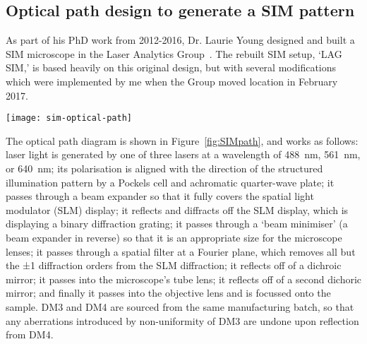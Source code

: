 \subsection{Optical path design to generate a SIM pattern} \label{sec:lagsim-path}
As part of his PhD work from 2012-2016, Dr. Laurie Young designed and built a SIM microscope in the Laser Analytics Group~\cite{young2016guide}. 
The rebuilt SIM setup, `LAG SIM,' is based heavily on this original design, but with several modifications which were implemented by me when the Group moved location in February 2017. 

\begin{sidewaysfigure}[p]
\centering
\texttt{[image: sim-optical-path]}
\caption[LAG SIM: Optics pattern laser light with a SIM pattern and apply polarisation rotation for optical sectioning and resolution enhancement]{The optical layout of the SIM aligns light from one of 3 lasers onto an optical path. The light passes through a Pockels cell and quarter wave plate for polarisation rotation, before a square-wave pattern is applied by a spatial light modulator. The patterned light is passed through a spatial mask in the Fourier plane to produce a sinusoidal pattern, which is relayed onto the sample. The objective lens collects fluorescent emission light,  which is filtered to remove any reflected excitation light before reaching the sCMOS camera.}
\label{fig:SIMpath}
\end{sidewaysfigure}

The optical path diagram is shown in Figure~\ref{fig:SIMpath}, and works as follows: laser light is generated by one of three lasers at a wavelength of \SI{488}{\nano\metre}, \SI{561}{\nano\metre}, or \SI{640}{\nano\metre}; its polarisation is aligned with the direction of the structured illumination pattern by a Pockels cell and achromatic quarter-wave plate; it passes through a beam expander so that it fully covers the spatial light modulator (SLM) display; it reflects and diffracts off the SLM display, which is displaying a binary diffraction grating; it passes through a `beam minimiser' (a beam expander in reverse) so that it is an appropriate size for the microscope lenses; it passes through a spatial filter at a Fourier plane, which removes all but the ±1 diffraction orders from the SLM diffraction; it reflects off of a dichroic mirror; it passes into the microscope's tube lens; it reflects off of a second dichoric mirror; and finally it passes into the objective lens and is focussed onto the sample. 
DM3 and DM4 are sourced from the same manufacturing batch, so that any aberrations introduced by non-uniformity of DM3 are undone upon reflection from DM4. 

